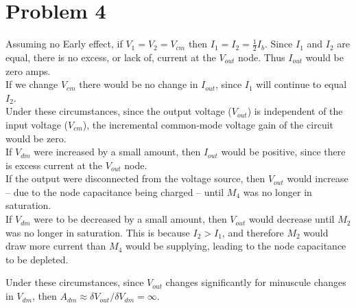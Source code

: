 \documentclass{article}
\begin{document}
    \section{Problem 4}
        Assuming no Early effect, if $V_1 = V_2 = V_{cm}$ then $I_1 = I_2 = \frac{1}{2}I_b$. Since $I_1$ and $I_2$ are equal, there is no excess, or lack of, current at the $V_{out}$ node. Thus $I_{out}$ would be zero amps.\\

        If we change $V_{cm}$ there would be no change in $I_{out}$, since $I_1$ will continue to equal $I_2$.\\

        Under these circumstances, since the output voltage ($V_{out}$) is independent of the input voltage ($V_{cm}$), the incremental common-mode voltage gain of the circuit would be zero.\\

        If $V_{dm}$ were increased by a small amount, then $I_{out}$ would be positive, since there is excess current at the $V_{out}$ node.\\

        If the output were disconnected from the voltage source, then $V_{out}$ would increase -- due to the node capacitance being charged -- until $M_4$ was no longer in saturation.\\

        If $V_{dm}$ were to be decreased by a small amount, then $V_{out}$ would decrease until $M_2$ was no longer in saturation. This is because $I_2 > I_1$, and therefore $M_2$ would draw more current than $M_4$ would be supplying, leading to the node capacitance to be depleted.

        Under these circumstances, since $V_{out}$ changes significantly for minuscule changes in $V_{dm}$, then $A_{dm} \approx \delta V_{out} / \delta V_{dm} = \infty$.
\end{document}
